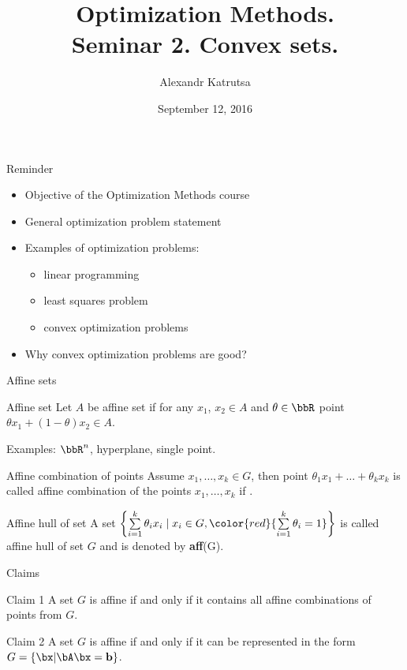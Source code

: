 \documentclass[12pt,russian]{beamer}
\title[Seminar 2]{Optimization Methods. \\
Seminar 2. Convex sets.}
\author{Alexandr Katrutsa}
\institute{Moscow Institute of Physics and Technology,\\
Department of Control and Applied Mathematics}
\date{September 12, 2016}
\begin{document}
\begin{frame}
\maketitle
\end{frame}

\begin{frame}{Reminder}

\begin{itemize}
\item Objective of the Optimization Methods course
\item General optimization problem statement
\item Examples of optimization problems: 
\begin{itemize}
\item linear programming
\item least squares problem
\item convex optimization problems
\end{itemize}
\item Why convex optimization problems are good?
\end{itemize}
\end{frame}

\begin{frame}{Affine sets}
\small
\begin{block}{Affine set}
Let $A$ be affine set if for any $x_1$, $x_2 \in A$ and $\theta \in \bbR$ point $\theta x_1 + (1 - \theta)x_2 \in A$.
\end{block}
Examples: $\bbR^n$, hyperplane, single point.

\begin{block}{Affine combination of points}
Assume $x_1, \ldots, x_k \in G$, then point $\theta_1 x_1 + \ldots + \theta_k x_k$ is called affine combination of the points $x_1,\ldots,x_k$ if {}.
\end{block}

\begin{block}{Affine hull of set}
A set $\left\{ \sum\limits_{i=1}^k \theta_i x_i \; | \; x_i \in G, {\color{red}{\sum\limits_{i=1}^k \theta_i = 1}} \right\}$ is called affine hull of set $G$ and is denoted by \textbf{aff}(G).
\end{block}
\end{frame}

\begin{frame}{Claims}

\begin{block}{Claim 1}
A set $G$ is affine if and only if it contains all affine combinations of points from $G$.
\end{block}

\begin{block}{Claim 2}
A set $G$ is affine if and only if it can be represented in the form  $G = \{\bx | \bA\bx = \mathbf{b} \}$.
\end{block}
\end{frame}
\end{document}
